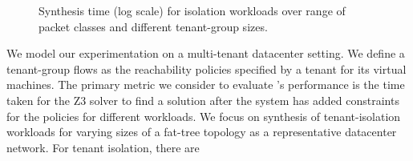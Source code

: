 \begin{figure}[width=2\columnwidth]
	\centering
	\caption{\label{fig:tactic-isolation}
		Synthesis time (log scale) for isolation workloads over range of packet classes and different tenant-group sizes.}
\end{figure}
We model our experimentation on a multi-tenant datacenter setting. We 
define a tenant-group flows as the reachability policies specified by a tenant
for its virtual machines. The primary metric we consider to evaluate \Name's 
performance is the time taken for the Z3 solver to find a solution after 
the system has added constraints for the policies for different workloads. 
We focus on synthesis of tenant-isolation
workloads for varying sizes of a fat-tree 
topology as a representative datacenter network. For tenant isolation, there are

